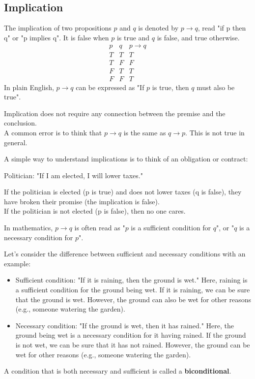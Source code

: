 \subsection{Implication}
\begin{definition}[Implication]
    The implication of two propositions $p$ and $q$ is denoted by $p \to q$, read "if p then q" or "p implies q". It is false when $p$ is true and $q$ is false, and true otherwise.
    \[
        \begin{array}{c|c|c}
            p & q & p \to q \\
            \hline
            T & T & T \\
            T & F & F \\
            F & T & T \\
            F & F & T
        \end{array}
    \]
    In plain English, $p \to q$ can be expressed as "If $p$ is true, then $q$ must also be true".
\end{definition}
Implication does not require any connection between the premise and the conclusion.\\
A common error is to think that $p \to q$ is the same as $q \to p$. This is not true in general.

\begin{eg}
    A simple way to understand implications is to think of an obligation or contract:
    \begin{center}
        Politician: "If I am elected, I will lower taxes."
    \end{center}
    If the politician is elected (p is true) and does not lower taxes (q is false), they have broken their promise (the implication is false). \\
    If the politician is not elected (p is false), then no one cares.
\end{eg}
In mathematics, $p \to q$ is often read as "$p$ is a sufficient condition for $q$", or "$q$ is a necessary condition for $p$".

\begin{eg}
    Let's consider the difference between sufficient and necessary conditions with an example:
    \begin{itemize}[itemsep=1pt,label=$\circ$]
        \item Sufficient condition: "If it is raining, then the ground is wet." Here, raining is a sufficient condition for the ground being wet. If it is raining, we can be sure that the ground is wet. However, the ground can also be wet for other reasons (e.g., someone watering the garden).
        \item Necessary condition: "If the ground is wet, then it has rained." Here, the ground being wet is a necessary condition for it having rained. If the ground is not wet, we can be sure that it has not rained. However, the ground can be wet for other reasons (e.g., someone watering the garden). 
    \end{itemize}
\end{eg}
A condition that is both necessary and sufficient is called a \textbf{biconditional}.

